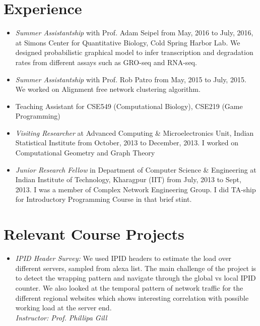 \documentclass{res}
\begin{document}
\begin{resume}
\section{Experience}
\begin{itemize}
\item {\it Summer Assistantship} with Prof. Adam Seipel from May, 2016 to July, 2016, at Simons Center for Quantitative Biology, Cold Spring Harbor Lab. We designed probabilistic graphical model to infer transcription and degradation rates from different assays such as GRO-seq and RNA-seq.  
\item {\it Summer Assistantship} with Prof. Rob Patro from May, 2015 to July, 2015. We worked on Alignment free network clustering algorithm.
\item  Teaching Assistant for CSE549 (Computational Biology), CSE219 (Game Programming)
\item {\it Visiting Researcher} at Advanced Computing \& Microelectronics Unit, Indian Statistical Institute from October, 2013 to December, 
2013. I worked on Computational Geometry and Graph Theory
\item {\it Junior Research Fellow} in Department of Computer Science \& Engineering at Indian Institute of Technology, Kharagpur (IIT) 
from July, 2013 to Sept, 2013. I was a member of Complex Network Engineering Group. I did TA-ship for Introductory Programming 
Course in that brief stint. 
\end{itemize}

\section{Relevant Course Projects}
\begin{itemize}
 \item{ \it{IPID Header Survey:}} We used IPID headers to estimate the load over different servers, sampled from alexa
 list. The main challenge of the project is to detect the wrapping pattern and navigate through the global vs local IPID counter. 
 We also looked at the temporal pattern of network traffic for the different regional websites which shows interesting correlation with possible 
 working load at the server end. \\
 {\it Instructor: Prof. Phillipa Gill}
 
 

\end{itemize}
\end{resume}
\end{document}
